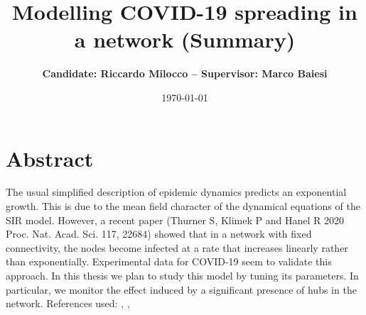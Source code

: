 \documentclass[11pt, a4paper, twoside]{article}
\title{\vspace{-2cm} \textbf{Modelling COVID-19 spreading in a network (Summary)}} %
\author{\vspace{2cm} \textbf{Candidate: Riccardo Milocco -- Supervisor: Marco Baiesi}}
\date{\vspace{-3em}\today}
\begin{document}
%

\maketitle
\section{Abstract}
The usual simplified description of epidemic dynamics predicts an exponential growth. This is due to the mean field character of the
dynamical equations of the SIR model. However, a recent paper (Thurner S, Klimek P and Hanel R 2020 Proc. Nat. Acad. Sci. 117, 22684) \cite{Thurner22684} showed
that in a network with fixed connectivity, the nodes become infected at a rate that increases linearly rather than exponentially.
Experimental data for COVID-19 seem to validate this approach. In this thesis we plan to study this model by tuning its parameters.
In particular, we monitor the effect induced by a significant presence of hubs in the network.
References used: \cite{Ferguson-CapturingHumanBehaviour}, \cite{SVespignani-EpSpreadSFNets}, \cite{Thurner22684}



\end{document}
